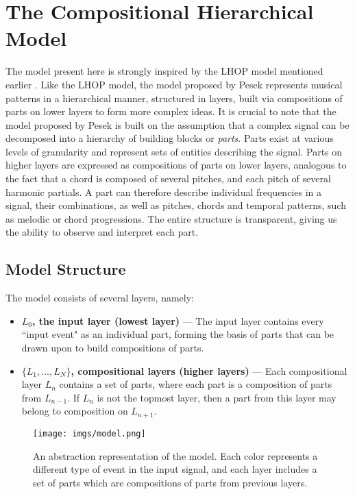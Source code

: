 \documentclass[../main.tex]{subfiles}
\begin{document}
\newpage
\section{The Compositional Hierarchical Model}
The model present here is strongly inspired by the LHOP model mentioned earlier \cite{Fidler:1}. Like the LHOP model, the model proposed by Pesek represents musical patterns in a hierarchical manner, structured in layers, built via compositions of parts on lower layers to form more complex ideas. It is crucial to note that the model proposed by Pesek is built on the assumption that a complex signal can be decomposed into a hierarchy of building blocks or \textit{parts}. Parts exist at various levels of granularity and represent sets of entities describing the signal.  Parts on higher layers are expressed as compositions of parts on lower layers, analogous to the fact that a chord is composed of several pitches, and each pitch of several harmonic partials. A part can therefore describe individual frequencies in a signal, their combinations, as well as pitches, chords and temporal patterns, such as melodic or chord progressions. The entire structure is transparent, giving us the ability to observe and interpret each part. 
\subsection{Model Structure}
\noindent
The model consists of several layers, namely:
\begin{itemize}
    \item \textbf{$L_0$, the input layer (lowest layer)} — The input layer contains every ``input event" as an individual part, forming the basis of parts that can be drawn upon to build compositions of parts.
    
    \item \textbf{$\{L_1, ..., L_N\}$, compositional layers (higher layers)} — Each compositional layer $L_n$ contains a set of parts, where each part is a composition of parts from $L_{n-1}$. If $L_n$ is not the topmost layer, then a part from this layer may belong to composition on $L_{n+1}$. 
\end{itemize}
\begin{figure}[ht]
    \centering
    \texttt{[image: imgs/model.png]}
    \caption{An abstraction representation of the model. Each color represents a different type of event in the input signal, and each layer includes a set of parts which are compositions of parts from previous layers.\cite{Pesek:1}}
    \label{fig:fig2}
\end{figure}
\end{document}
